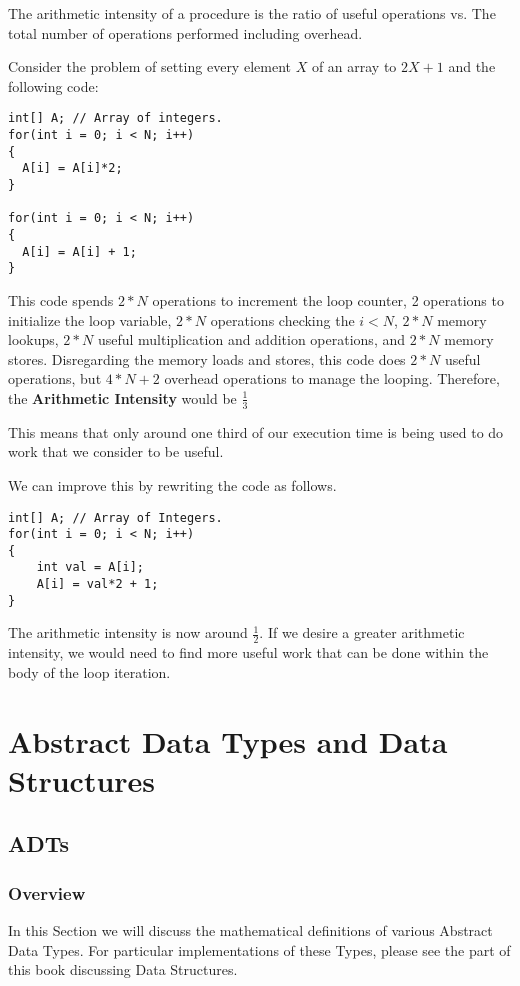 \documentclass[12pt, letterpaper]{book}
\begin{document}
The arithmetic intensity of a procedure is the ratio of useful operations vs. The total number of operations performed including overhead.

Consider the problem of setting every element $X$ of an array to $2X + 1$ and the following code:

\begin{verbatim}
int[] A; // Array of integers.
for(int i = 0; i < N; i++)
{
  A[i] = A[i]*2;
}

for(int i = 0; i < N; i++)
{
  A[i] = A[i] + 1;
}
\end{verbatim}

This code spends $2*N$ operations to increment the loop counter, 2 operations to initialize the loop variable, $2*N$ operations checking the $i < N$, $2*N$ memory lookups, $2*N$ useful multiplication and addition operations, and $2*N$ memory stores.
Disregarding the memory loads and stores, this code does $2*N$ useful operations, but $4*N + 2$ overhead operations to manage the looping. Therefore, the \textbf{Arithmetic Intensity} would be $\frac{1}{3}$

This means that only around one third of our execution time is being used to do work that we consider to be useful.

We can improve this by rewriting the code as follows.
\begin{verbatim}
int[] A; // Array of Integers.
for(int i = 0; i < N; i++)
{
	int val = A[i];
	A[i] = val*2 + 1;
}
\end{verbatim}

The arithmetic intensity is now around $\frac{1}{2}$. If we desire a greater arithmetic intensity, we would need to find more useful work that can be done within the body of the loop iteration.

\part{Abstract Data Types and Data Structures}

\chapter{ADTs} \label{ADTs}

	\section{Overview}

	In this Section we will discuss the mathematical definitions of various Abstract Data Types. For particular implementations of these Types, please see the part of this book discussing Data Structures.
\end{document}
